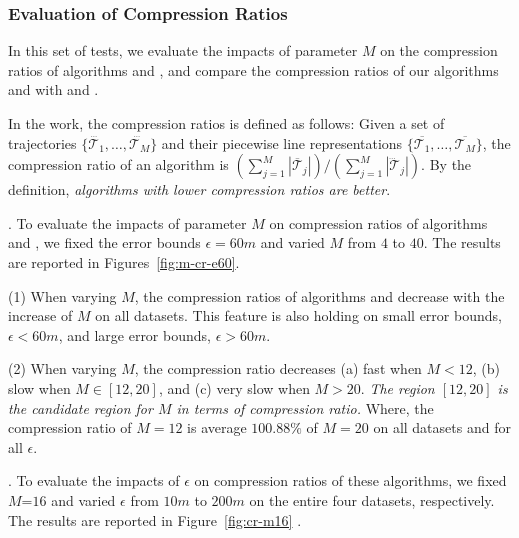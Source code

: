 \subsubsection{Evaluation of Compression Ratios}


In this set of tests, we evaluate the impacts of parameter $M$ on the compression ratios of algorithms \cist and \cista, and compare the compression ratios of our algorithms \cist and \cista with \dps and \squishe.

In the work, the compression ratios is defined as follows: Given a set of trajectories $\{\dddot{\mathcal{T}_1}, \ldots, \dddot{\mathcal{T}_M}\}$ and their piecewise line representations $\{\overline{\mathcal{T}_1}, \ldots, \overline{\mathcal{T}_M}\}$, the compression ratio of an algorithm is $(\sum_{j=1}^{M} |\overline{\mathcal{T}}_j |)/(\sum_{j=1}^{M} |\dddot{\mathcal{T}}_j |)$.
By the definition, \emph{algorithms with lower compression ratios are better}.




.
To evaluate the impacts of parameter $M$ on compression ratios of algorithms \cist and \cista, we fixed the error bounds {$\epsilon =60m$} and varied $M$ from $4$ to $40$.
The results are reported in Figures~\ref{fig:m-cr-e60}.

\ni(1) When varying $M$, the compression ratios of algorithms \cist and \cista decrease with the increase of $M$ on all datasets. This feature is also holding on small error bounds, \eg $\epsilon < 60m$, and large error bounds, \eg $\epsilon > 60m$.

\ni(2) When varying $M$, the compression ratio decreases (a) fast when $M < 12$, (b) slow when $M \in [12, 20]$, and (c) very slow when $M  > 20$.
\emph{The region $[12, 20]$ is the candidate region for $M$ in terms of compression ratio.}
Where, the compression ratio of $M=12$ is average {$100.88\%$} of $M=20$ on all datasets and for all $\epsilon$.




.
To evaluate the impacts of $\epsilon$ on compression ratios of these algorithms, we fixed {$M$=$16$} and varied $\epsilon$ from $10m$ to $200m$ on the entire four datasets, respectively.
The results are reported in Figure~\ref{fig:cr-m16} .


